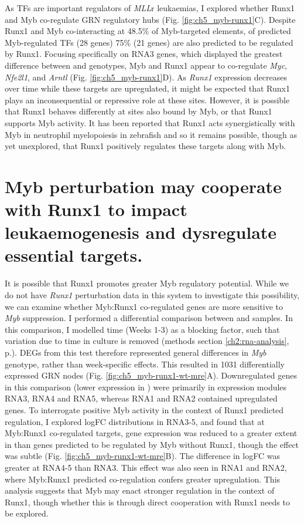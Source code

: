 As TFs are important regulators of \textit{MLL}r leukaemias, I explored whether Runx1 and Myb co-regulate GRN regulatory hubs (Fig. \ref{fig:ch5_myb-runx1}C). Despite Runx1 and Myb co-interacting at 48.5\% of Myb-targeted elements, of predicted Myb-regulated TFs (28 genes) 75\% (21 genes) are also predicted to be regulated by Runx1. Focusing specifically on RNA3 genes, which displayed the greatest difference between \mybwt{} and \mybmre{} genotypes, Myb and Runx1 appear to co-regulate \textit{Myc}, \textit{Nfe2l1}, and \textit{Arntl} (Fig. \ref{fig:ch5_myb-runx1}D). As \textit{Runx1} expression decreases over time while these targets are upregulated, it might be expected that Runx1 plays an inconsequential or repressive role at these sites. However, it is possible that Runx1 behaves differently at sites also bound by Myb, or that Runx1 supports Myb activity. It has been reported that Runx1 acts synergistically with Myb in neutrophil myelopoiesis in zebrafish \citep{huang_runx1_2021} and so it remains possible, though as yet unexplored, that Runx1 positively regulates these targets along with Myb.


\section{\label{ch5:myb-runx1-essential}Myb perturbation may cooperate with Runx1 to impact leukaemogenesis and dysregulate essential targets.}

It is possible that Runx1 promotes greater Myb regulatory potential. While we do not have \textit{Runx1} perturbation data in this system to investigate this possibility, we can examine whether Myb:Runx1 co-regulated genes are more sensitive to \textit{Myb} suppression. I performed a differential comparison between \mybwt{} and \mybmre{} samples. In this comparison, I modelled time (Weeks 1-3) as a blocking factor, such that variation due to time in culture is removed (methods section \ref{ch2:rna-analysis}, p.\pageref{ch2:rna-analysis}). DEGs from this test therefore represented general differences in \textit{Myb} genotype, rather than week-specific effects. This resulted in 1031 differentially expressed GRN nodes (Fig. \ref{fig:ch5_myb-runx1-wt-mre}A). Downregulated genes in this comparison (lower expression in \mybmre{}) were primarily in expression modules RNA3, RNA4 and RNA5, whereas RNA1 and RNA2 contained upregulated genes. To interrogate positive Myb activity in the context of Runx1 predicted regulation, I explored logFC distributions in RNA3-5, and found that at Myb:Runx1 co-regulated targets, gene expression was reduced to a greater extent in \mybmre{} than genes predicted to be regulated by Myb without Runx1, though the effect was subtle (Fig. \ref{fig:ch5_myb-runx1-wt-mre}B). The difference in logFC was greater at RNA4-5 than RNA3. This effect was also seen in RNA1 and RNA2, where Myb:Runx1 predicted co-regulation confers greater upregulation. This analysis suggests that Myb may enact stronger regulation in the context of Runx1, though whether this is through direct cooperation with Runx1 needs to be explored.

